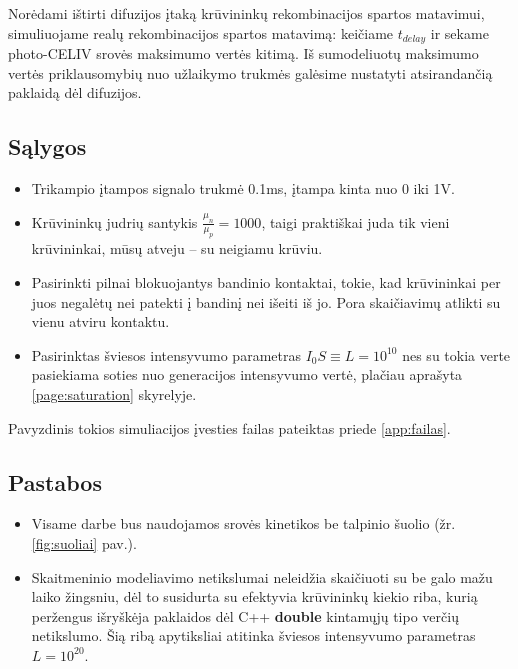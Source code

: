 Norėdami ištirti difuzijos įtaką krūvininkų rekombinacijos spartos matavimui, simuliuojame realų rekombinacijos spartos matavimą: keičiame \(t_{delay}\) ir sekame photo-CELIV srovės maksimumo vertės kitimą. Iš sumodeliuotų maksimumo vertės priklausomybių nuo užlaikymo trukmės galėsime nustatyti atsirandančią paklaidą dėl difuzijos.

\subsection{Sąlygos}
\label{page:params}
\begin{itemize}
\item Trikampio įtampos signalo trukmė 0.1ms, įtampa kinta nuo 0 iki 1V.
\item Krūvininkų judrių santykis \(\frac{\mu_n}{\mu_p} = 1000\), taigi praktiškai juda tik vieni krūvininkai, mūsų atveju -- su neigiamu krūviu. 
\item Pasirinkti pilnai blokuojantys bandinio kontaktai, tokie, kad krūvininkai per juos negalėtų nei patekti į bandinį  nei išeiti iš jo. Pora skaičiavimų atlikti su vienu atviru kontaktu.
\item Pasirinktas šviesos intensyvumo parametras \(I_0 S \equiv L = 10^{10} \) nes su tokia verte pasiekiama soties nuo generacijos intensyvumo vertė, plačiau aprašyta \ref{page:saturation} skyrelyje.
\end{itemize}
Pavyzdinis tokios simuliacijos įvesties failas pateiktas priede \ref{app:failas}.

\subsection{Pastabos}
\label{page:specials}
\begin{itemize}
\item Visame darbe bus naudojamos srovės kinetikos be talpinio šuolio (žr. \ref{fig:suoliai} pav.).
\item Skaitmeninio modeliavimo netikslumai neleidžia skaičiuoti su be galo mažu laiko žingsniu, dėl to susidurta su efektyvia krūvininkų kiekio riba, kurią peržengus išryškėja paklaidos dėl C++ \textbf{double} kintamųjų tipo verčių netikslumo. Šią ribą apytiksliai atitinka šviesos intensyvumo parametras $L=10^{20}$.
\end{itemize}